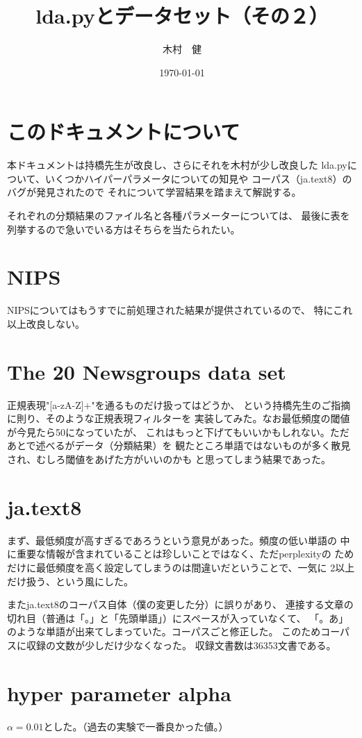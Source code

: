 \documentclass[uplatex,dvipdfmx]{jsarticle}
\begin{document}
\title{\huge lda.pyとデータセット（その２）}
\author{木村　健}
\date{\today}
\maketitle


\section{このドキュメントについて}
本ドキュメントは持橋先生が改良し、さらにそれを木村が少し改良した
lda.pyについて、いくつかハイパーパラメータについての知見や
コーパス（ja.text8）のバグが発見されたので
それについて学習結果を踏まえて解説する。

それぞれの分類結果のファイル名と各種パラメーターについては、
最後に表を列挙するので急いでいる方はそちらを当たられたい。


\section{NIPS}
NIPSについてはもうすでに前処理された結果が提供されているので、
特にこれ以上改良しない。

\section{The 20 Newsgroups data set}
正規表現"[a-zA-Z]+"を通るものだけ扱ってはどうか、
という持橋先生のご指摘に則り、そのような正規表現フィルターを
実装してみた。なお最低頻度の閾値が今見たら50になっていたが、
これはもっと下げてもいいかもしれない。ただあとで述べるがデータ（分類結果）を
観たところ単語ではないものが多く散見され、むしろ閾値をあげた方がいいのかも
と思ってしまう結果であった。

\section{ja.text8}
まず、最低頻度が高すぎるであろうという意見があった。頻度の低い単語の
中に重要な情報が含まれていることは珍しいことではなく、ただperplexityの
ためだけに最低頻度を高く設定してしまうのは間違いだということで、一気に
2以上だけ扱う、という風にした。

またja.text8のコーパス自体（僕の変更した分）に誤りがあり、
連接する文章の切れ目（普通は「。」と「先頭単語」）にスペースが入っていなくて、
「。あ」のような単語が出来てしまっていた。コーパスごと修正した。
このためコーパスに収録の文数が少しだけ少なくなった。
収録文書数は36353文書である。

\section{hyper parameter alpha}
$\alpha=0.01$とした。（過去の実験で一番良かった値。）
\end{document}
